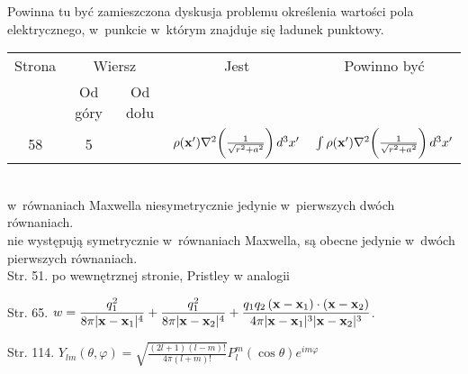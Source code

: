 \documentclass[a4paper,11pt]{article}
\numberwithin{equation}{section}
\begin{document}
\noindent
{} Powinna tu być zamieszczona dyskusja problemu określenia wartości
pola elektrycznego, w~punkcie w~którym znajduje się ładunek punktowy.





\newpage



\begin{center}

  \begin{tabular}{|c|c|c|c|c|}
    \hline
    Strona & \multicolumn{2}{c|}{Wiersz} & Jest
                              & Powinno być \\ \cline{2-3}
    & Od góry & Od dołu & & \\
    \hline
    58 & 5 & & $\rho( \bold{ x }' ) \nabla^{ 2 } \bigg(
               \frac{ 1 }{ \sqrt{ r^{ 2 } + a^{ 2 } } } \bigg) \, d^{ 3 } x'$
    & $\int \rho( \bold{ x }' ) \nabla^{ 2 } \bigg(
      \frac{ 1 }{ \sqrt{ r^{ 2 } + a^{ 2 } } } \bigg) \, d^{ 3 } x'$ \\
    \hline
  \end{tabular}

\end{center}

\VerSpaceTwo


\noindent
{} \\
\Jest w~równaniach Maxwella niesymetrycznie jedynie w~pierwszych dwóch
równaniach. \\
\PowinnoByc nie występują symetrycznie w~równaniach Maxwella, są obecne jedynie
w~dwóch pierwszych równaniach. \\

Str. 51. po wewnętrznej stronie, Pristley w analogii

Str. 65. $\displaystyle w = \frac{ q^{ 2 }_{ 1 } }{ 8 \pi | \mathbf{x} - \mathbf{x}_{ 1 } |^{ 4 } } + \frac{ q^{ 2 }_{ 1 } }{ 8 \pi | \mathbf{x} - \mathbf{x}_{ 2 } |^{ 4 } } + \frac{ q_{ 1 } q_{ 2 } \, ( \mathbf{x} - \mathbf{x}_{ 1 } ) \cdot ( \mathbf{x} - \mathbf{x}_{ 2 } ) }{ 4 \pi | \mathbf{x} - \mathbf{x}_{ 1 } |^{ 3 } | \mathbf{x} - \mathbf{x}_{ 2 } |^{ 3 } }$.

Str. 114. $\displaystyle Y_{ l m }( \theta, \varphi ) = \sqrt{ \frac{ ( 2l + 1 ) ( l - m )! }{ 4 \pi ( l + m )! } } P^{ m }_{ l }( \cos \theta ) e^{ i m \varphi }$
\end{document}
